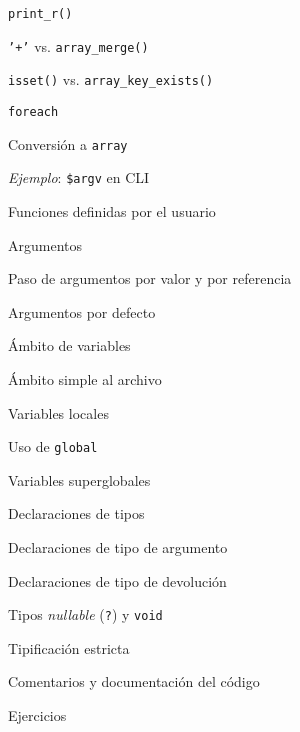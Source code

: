 \begin{longenum}
\begin{longenum}
\begin{longenum}
\begin{longenum}
                \item \texttt{print\_r()}
                \item \texttt{'+'} vs. \texttt{array\_merge()}
                \item \texttt{isset()} vs. \texttt{array\_key\_exists()}
            \end{longenum}
            \item \texttt{foreach}
            \item Conversión a \texttt{array}
            \item \textit{Ejemplo}: \texttt{\$argv} en CLI
        \end{longenum}
        \item Funciones definidas por el usuario
        \begin{longenum}
            \item Argumentos
            \begin{longenum}
                \item Paso de argumentos por valor y por referencia
                \item Argumentos por defecto
            \end{longenum}
            \item Ámbito de variables
            \begin{longenum}
                \item Ámbito simple al archivo
                \item Variables locales
                \item Uso de \texttt{global}
                \item Variables superglobales
            \end{longenum}
            \item Declaraciones de tipos
            \begin{longenum}
                \item Declaraciones de tipo de argumento
                \item Declaraciones de tipo de devolución
                \item Tipos \textit{nullable} (\texttt{?}) y \texttt{void}
                \item Tipificación estricta
            \end{longenum}
        \end{longenum}
        \item Comentarios y documentación del código
        \item Ejercicios

\end{longenum}
\end{longenum}
